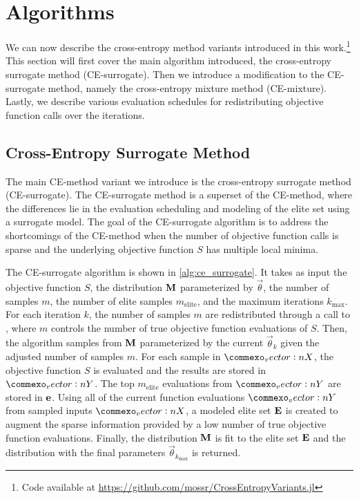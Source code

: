 \section{Algorithms} \label{sec:cem_algorithms}
We can now describe the cross-entropy method variants introduced in this work.\footnote{Code available at \href{https://github.com/mossr/CrossEntropyVariants.jl}{https://github.com/mossr/CrossEntropyVariants.jl}}
This section will first cover the main algorithm introduced, the cross-entropy surrogate method (CE-surrogate).
Then we introduce a modification to the CE-surrogate method, namely the cross-entropy mixture method (CE-mixture).
Lastly, we describe various evaluation schedules for redistributing objective function calls over the iterations.

\subsection{Cross-Entropy Surrogate Method} \label{sec:cem_alg_ce_surrogate}
The main CE-method variant we introduce is the cross-entropy surrogate method (CE-surrogate).
The CE-surrogate method is a superset of the CE-method, where the differences lie in the evaluation scheduling and modeling of the elite set using a surrogate model.
The goal of the CE-surrogate algorithm is to address the shortcomings of the CE-method when the number of objective function calls is sparse and the underlying objective function $S$ has multiple local minima.

The CE-surrogate algorithm is shown in \cref{alg:ce_surrogate}.
It takes as input the objective function $S$, the distribution $\mathbf{M}$ parameterized by $\vec{\theta}$, the number of samples $m$, the number of elite samples $m_\text{elite}$, and the maximum iterations $k_\text{max}$.
For each iteration $k$, the number of samples $m$ are redistributed through a call to , where $m$ controls the number of true objective function evaluations of $S$. %
Then, the algorithm samples from $\mathbf{M}$ parameterized by the current $\vec{\theta}_k$ given the adjusted number of samples $m$. %
For each sample in $\mat{X}$, the objective function $S$ is evaluated and the results are stored in $\mat{Y}$.
The top $m_\text{elite}$ evaluations from $\mat{Y}$ are stored in $\mathbf{e}$. 
Using all of the current function evaluations $\mat{Y}$ from sampled inputs $\mat{X}$, a modeled elite set $\mathbf{E}$ is created to augment the sparse information provided by a low number of true objective function evaluations.
Finally, the distribution $\mathbf{M}$ is fit to the elite set $\mathbf{E}$ and the distribution with the final parameters $\vec{\theta}_{k_\text{max}}$ is returned.

